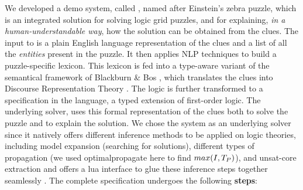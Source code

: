 % 
We developed a demo system, called \ourtool, named after Einstein's zebra puzzle, which is an integrated solution for solving logic grid puzzles, and for explaining,  \textit{in a human-understandable way}, how the solution can be obtained from the clues. 
The input to \ourtool is a plain English language representation of the clues and a list of all the \textit{entities} present in the puzzle. It then applies NLP techniques to build a puzzle-specific lexicon. This lexicon is fed into a type-aware variant of the semantical framework of Blackburn \& Bos \cite{Blackburn2005,Blackburn2006}, which translates the clues into Discourse Representation Theory \cite{DRT}. The logic is further transformed to a specification in the \idp language, a typed extension of first-order logic. 
% 
The underlying solver, \idp\cite{IDP} uses this formal representation of the clues both to solve the puzzle and to explain the solution. 
We chose the \idp system as an underlying solver since it natively offers different inference methods to be applied on logic theories, including model expansion (searching for solutions), different types of propagation (we used optimalpropagate here to find $max(I,T_P)$), and unsat-core extraction and offers a lua interface to glue these inference steps together seamlessly \cite{IDP}. 
The complete specification undergoes the following \textbf{steps}:
